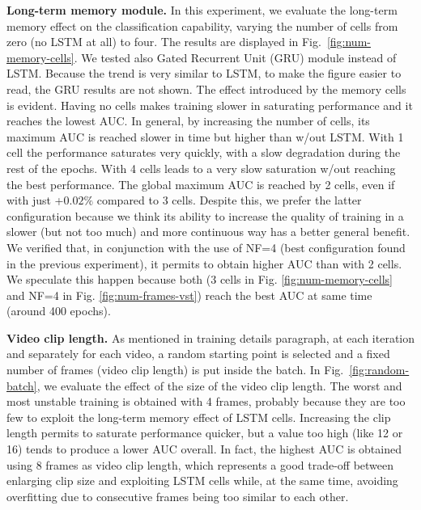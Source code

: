 \noindent\textbf{Long-term memory module.}
In this experiment, we evaluate the long-term memory effect on the classification capability, varying the number of cells from zero (no LSTM at all) to four.
The results are displayed in Fig.~\ref{fig:num-memory-cells}.
We tested also Gated Recurrent Unit (GRU) module instead of LSTM.
Because the trend is very similar to LSTM, to make the figure easier to read, the GRU results are not shown.
The effect introduced by the memory cells is evident.
Having no cells makes training slower in saturating performance and it reaches the lowest AUC.
In general, by increasing the number of cells, its maximum AUC is reached slower in time but higher than w/out LSTM.
With 1 cell the performance saturates very quickly, with a slow degradation during the rest of the epochs.
With 4 cells leads to a very slow saturation w/out reaching the best performance.
The global maximum AUC is reached by 2 cells, even if with just +$0.02\%$ compared to 3 cells.
Despite this, we prefer the latter configuration because we think its ability to increase the quality of training in a slower (but not too much) and more continuous way has a better general benefit.
We verified that, in conjunction with the use of NF=4 (best configuration found in the previous experiment), it permits to obtain higher AUC than with 2 cells.
We speculate this happen because both (3 cells in Fig. \ref{fig:num-memory-cells} and NF=4 in Fig. \ref{fig:num-frames-vst}) reach the best AUC at same time (around 400 epochs).


\noindent\textbf{Video clip length.}
As mentioned in training details paragraph, at each iteration and separately for each video, a random starting point is selected and a fixed number of frames (video clip length) is put inside the batch.
In Fig.~\ref{fig:random-batch}, we evaluate the effect of the size of the video clip length.
The worst and most unstable training is obtained with 4 frames, probably because they are too few to exploit the long-term memory effect of LSTM cells.
Increasing the clip length permits to saturate performance quicker, but a value too high (like 12 or 16) tends to produce a lower AUC overall.
In fact, the highest AUC is obtained using 8 frames as video clip length, which represents a good trade-off between enlarging clip size and exploiting LSTM cells while, at the same time, avoiding overfitting due to consecutive frames being too similar to each other.

